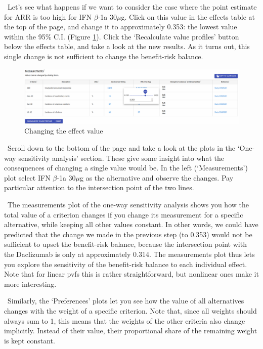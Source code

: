 \documentclass[00_mcda_tutorial.tex]{subfiles}
\begin{document}
\noindent \leftpointright \, Let’s see what happens if we want to consider the case where the point estimate for ARR is too high for IFN $\beta$-1a 30$\mu$g. Click on this value in the effects table at the top of the page, and change it to approximately 0.353: the lowest value within the 95\% C.I. (Figure \ref{fig:changeARR}). Click the ‘Recalculate value profiles’ button below the effects table, and take a look at the new results. As it turns out, this single change is not sufficient to change the benefit-risk balance.
\newline

\begin{figure}[!h]
    \centering
    \includegraphics[width=\textwidth]{fig/changeARR.png}
    \caption{Changing the effect value}
    \label{fig:changeARR}
\end{figure}

\noindent \leftpointright \, Scroll down to the bottom of the page and take a look at the plots in the ‘One-way sensitivity analysis’ section. These give some insight into what the consequences of changing a single value would be. In the left (‘Measurements’) plot select IFN $\beta$-1a 30$\mu$g as the alternative and observe the changes. Pay particular attention to the intersection point of the two lines.
\newline

\noindent \faGraduationCap \, The measurements plot of the one-way sensitivity analysis shows you how the total value of a criterion changes if you change its measurement for a specific alternative, while keeping all other values constant. In other words, we could have predicted that the change we made in the previous step (to 0.353) would not be sufficient to upset the benefit-risk balance, because the intersection point with the Daclizumab is only at approximately 0.314. The measurements plot thus lets you explore the sensitivity of the benefit-risk balance to each individual effect. Note that for linear pvfs this is rather straightforward, but nonlinear ones make it more interesting.
\newline

\noindent \faGraduationCap \, Similarly, the ‘Preferences’ plots let you see how the value of all alternatives changes with the weight of a specific criterion. Note that, since all weights should always sum to 1, this means that the weights of the other criteria also change implicitly. Instead of their value, their proportional share of the remaining weight is kept constant.
\newline
\end{document}
